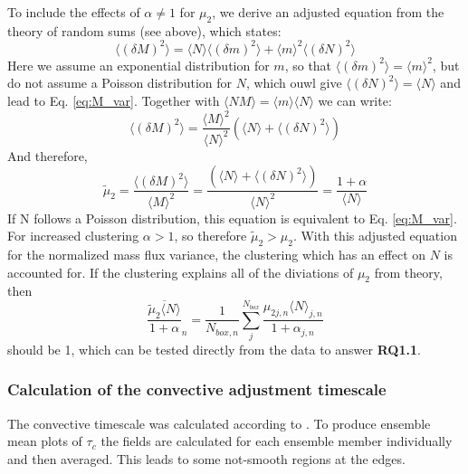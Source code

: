 \documentclass[a4paper, 12pt, draft]{article}
\begin{document}
To include the effects of $\alpha \neq 1$ for $\mu_2$, we derive an adjusted equation from the theory of random sums (see above), which states:
\begin{equation} \label{eq:derivation_1}
 \langle (\delta M)^2 \rangle = \langle N \rangle \langle (\delta m)^2 \rangle + \langle m \rangle^2 \langle (\delta N)^2 \rangle
\end{equation}
Here we assume an exponential distribution for $m$, so that $\langle (\delta m)^2 \rangle = \langle m \rangle^2$, but do not assume a Poisson distribution for $N$, which ouwl give $\langle (\delta N)^2 \rangle = \langle N \rangle$ and lead to Eq. \ref{eq:M_var}. Together with $\langle NM \rangle = \langle m \rangle \langle N \rangle$ we can write:
\begin{equation} \label{eq:derivation_2}
 \langle (\delta M)^2 \rangle = \frac{\langle M \rangle^2}{\langle N \rangle^2} (\langle N \rangle + \langle (\delta N)^2 \rangle)
\end{equation}
And therefore,
\begin{equation} \label{eq:adjusted_M_var}
 \tilde{\mu}_2 = \frac{\langle (\delta M)^2 \rangle}{\langle M \rangle^2} = \frac{(\langle N \rangle + \langle (\delta N)^2 \rangle)}{\langle N \rangle^2 } = \frac{1+\alpha}{\langle N \rangle}
\end{equation}
If N follows a Poisson distribution, this equation is equivalent to Eq. \ref{eq:M_var}. For increased clustering $\alpha>1$, so therefore $\tilde{\mu}_2 > \mu_2$. With this adjusted equation for the normalized mass flux variance, the clustering which has an effect on $N$ is accounted for. If the clustering explains all of the diviations of $\mu_2$ from theory, then 
\begin{equation} \label{eq:adjusted_M_var}
 \overline{\frac{\tilde{\mu}_2 \langle N \rangle}{1+\alpha}}_n = \frac{1}{N_{box, n}} \sum_{j}^{N_{box}} \frac{\mu_{2 j,n}\langle N\rangle_{j,n}}{1 + \alpha_{j,n}}
\end{equation} 
should be 1, which can be tested directly from the data to answer \textbf{RQ1.1}.

\subsubsection{Calculation of the convective adjustment timescale}
The convective timescale was calculated according to \cite{Flack2016}. To produce ensemble mean plots of $\tau_c$ the fields are calculated for each ensemble member individually and then averaged. This leads to some not-smooth regions at the edges. 
\end{document}
